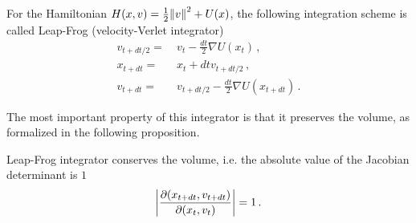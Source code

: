 \begin{mybox}
    \begin{definition}
    For the Hamiltonian $H(x,v) = \frac{1}{2}\norm{v}^2 + U(x)$, the following integration scheme is called Leap-Frog (velocity-Verlet integrator)
    \begin{align}
        v_{t+dt/2} =~& v_t - \frac{dt}{2}\nabla U(x_t)\,,\\
        x_{t+dt} =~& x_t + dtv_{t+dt/2}\,,\\
        v_{t+dt} =~& v_{t+dt/2} - \frac{dt}{2}\nabla U(x_{t+dt})\,.
    \end{align}
    \end{definition}
\end{mybox}
The most important property of this integrator is that it preserves the volume, as formalized in the following proposition.
\begin{proposition}
    Leap-Frog integrator conserves the volume, i.e. the absolute value of the Jacobian determinant is $1$
    \begin{align}
        \bigg|\frac{\partial (x_{t+dt}, v_{t+dt})}{\partial (x_{t}, v_{t})}\bigg| = 1\,.
    \end{align}
\end{proposition}
